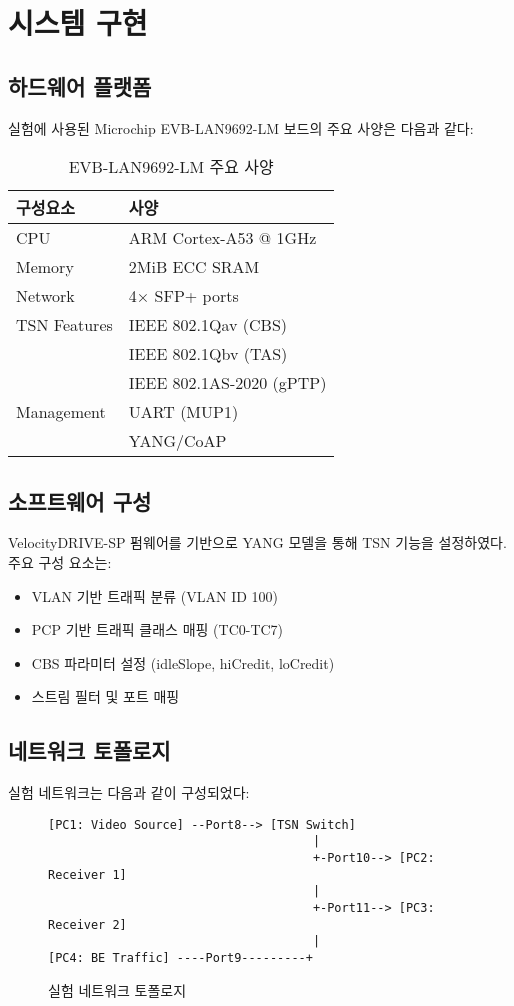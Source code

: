 \documentclass[10pt,twocolumn]{article}
\begin{document}
\section{시스템 구현}

\subsection{하드웨어 플랫폼}
실험에 사용된 Microchip EVB-LAN9692-LM 보드의 주요 사양은 다음과 같다:

\begin{table}[h]
\centering
\caption{EVB-LAN9692-LM 주요 사양}
\begin{tabular}{ll}
\toprule
구성요소 & 사양 \\
\midrule
CPU & ARM Cortex-A53 @ 1GHz \\
Memory & 2MiB ECC SRAM \\
Network & 4× SFP+ ports \\
TSN Features & IEEE 802.1Qav (CBS) \\
& IEEE 802.1Qbv (TAS) \\
& IEEE 802.1AS-2020 (gPTP) \\
Management & UART (MUP1) \\
& YANG/CoAP \\
\bottomrule
\end{tabular}
\end{table}

\subsection{소프트웨어 구성}
VelocityDRIVE-SP 펌웨어를 기반으로 YANG 모델을 통해 TSN 기능을 설정하였다. 주요 구성 요소는:

\begin{itemize}
\item VLAN 기반 트래픽 분류 (VLAN ID 100)
\item PCP 기반 트래픽 클래스 매핑 (TC0-TC7)
\item CBS 파라미터 설정 (idleSlope, hiCredit, loCredit)
\item 스트림 필터 및 포트 매핑
\end{itemize}

\subsection{네트워크 토폴로지}
실험 네트워크는 다음과 같이 구성되었다:

\begin{figure}[h]
\centering
\caption{실험 네트워크 토폴로지}
\begin{verbatim}
[PC1: Video Source] --Port8--> [TSN Switch]
                                     |
                                     +-Port10--> [PC2: Receiver 1]
                                     |
                                     +-Port11--> [PC3: Receiver 2]
                                     |
[PC4: BE Traffic] ----Port9---------+
\end{verbatim}
\end{figure}
\end{document}

